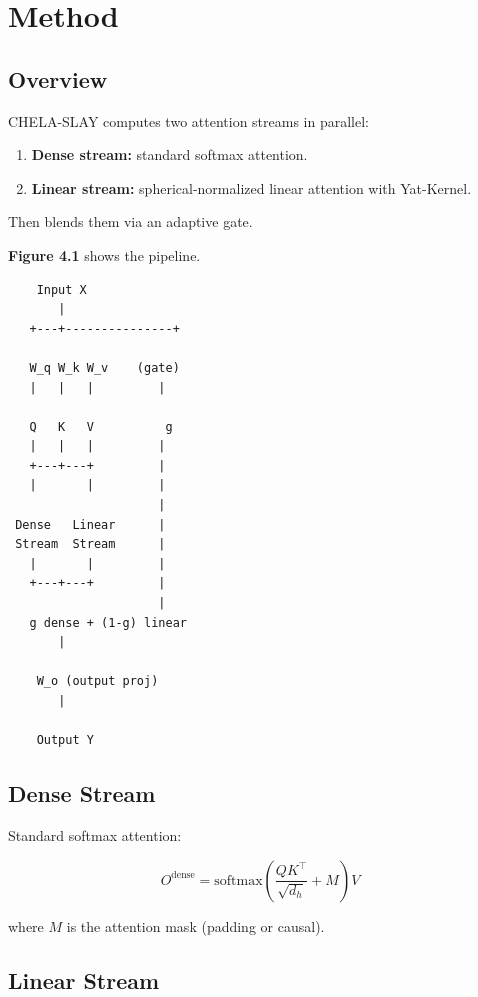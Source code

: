 \section{Method}

\subsection{Overview}

CHELA-SLAY computes two attention streams in parallel:

\begin{enumerate}
\item \textbf{Dense stream:} standard softmax attention.
\item \textbf{Linear stream:} spherical-normalized linear attention with Yat-Kernel.

\end{enumerate}
Then blends them via an adaptive gate.

\textbf{Figure 4.1} shows the pipeline.

\begin{lstlisting}
    Input X
       |
   +---+---------------+
                        
   W_q W_k W_v    (gate)
   |   |   |         |
                      
   Q   K   V          g
   |   |   |         |
   +---+---+         |
   |       |         |
                     |
 Dense   Linear      |
 Stream  Stream      |
   |       |         |
   +---+---+         |
                     |
   g dense + (1-g) linear
       |
        
    W_o (output proj)
       |
        
    Output Y
\end{lstlisting}

\subsection{Dense Stream}

Standard softmax attention:

\[
O^\text{dense} = \text{softmax}\!\left(\frac{Q K^\top}{\sqrt{d_h}} + M\right) V
\]

where $M$ is the attention mask (padding or causal).

\subsection{Linear Stream}

